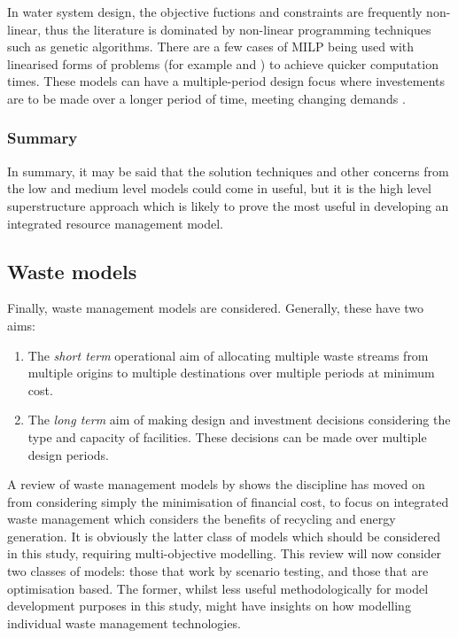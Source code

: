 In water system design, the objective fuctions and constraints are frequently non-linear, thus the literature is dominated by non-linear programming techniques such as genetic algorithms. There are a few cases of MILP being used with linearised forms of problems (for example \citet{Zanganeh2010} and \citet{Lejano2006}) to achieve quicker computation times. These models can have a multiple-period design focus where investements are to be made over a longer period of time, meeting changing demands \citep{Chung2008}.

\subsubsection*{Summary}
In summary, it may be said that the solution techniques and other concerns from the low and medium level models could come in useful, but it is the high level superstructure approach which is likely to prove the most useful in developing an integrated resource management model.

\subsection{Waste models}
Finally, waste management models are considered. Generally, these have two aims:
\begin{enumerate}
	\item The \emph{short term} operational aim of allocating multiple waste streams from multiple origins to multiple destinations over multiple periods at minimum cost. 
	\item The \emph{long term} aim of making design and investment decisions considering the type and capacity of facilities. These decisions can be made over multiple design periods.
\end{enumerate}
A review of waste management models by \citet{Morrissey2004} shows the discipline has moved on from considering simply the minimisation of financial cost, to focus on integrated waste management which considers the benefits of recycling and energy generation. It is obviously the latter class of models which should be considered in this study, requiring multi-objective modelling. This review will now consider two classes of models: those that work by scenario testing, and those that are optimisation based. The former, whilst less useful methodologically for model development purposes in this study, might have insights on how modelling individual waste management technologies.

